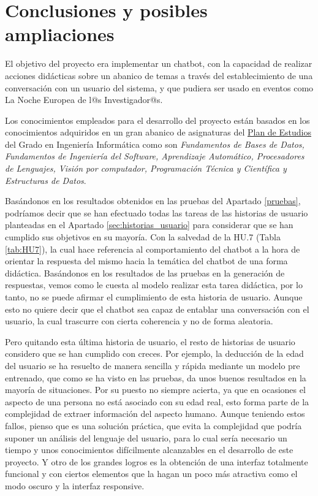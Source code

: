 \chapter{Conclusiones y posibles ampliaciones}

El objetivo del proyecto era implementar un chatbot, con la capacidad de realizar acciones didácticas sobre un abanico de temas a través del establecimiento de una conversación con un usuario del sistema, y que pudiera ser usado en eventos como La Noche Europea de l@s Investigador@s.

Los conocimientos empleados para el desarrollo del proyecto están basados en los conocimientos adquiridos en un gran abanico de asignaturas del \href{https://grados.ugr.es/informatica/pages/infoacademica/estudios}{Plan de Estudios} del Grado en Ingeniería Informática como son \textit{Fundamentos de Bases de Datos, Fundamentos de Ingeniería del Software, Aprendizaje Automático, Procesadores de Lenguajes, Visión por computador, Programación Técnica y Científica y Estructuras de Datos}.

Basándonos en los resultados obtenidos en las pruebas del Apartado \ref{pruebas}, podríamos decir que se han efectuado todas las tareas de las historias de usuario planteadas en el Apartado \ref{sec:historias_usuario} para considerar que se han cumplido sus objetivos en su mayoría. Con la salvedad de la HU.7 (Tabla \ref{tab:HU7}), la cual hace referencia al comportamiento del chatbot a la hora de orientar la respuesta del mismo hacia la temática del chatbot de una forma didáctica. Basándonos en los resultados de las pruebas en la generación de respuestas, vemos como le cuesta al modelo realizar esta tarea didáctica, por lo tanto, no se puede afirmar el cumplimiento de esta historia de usuario. Aunque esto no quiere decir que el chatbot sea capaz de entablar una conversación con el usuario, la cual trascurre con cierta coherencia y no de forma aleatoria.

Pero quitando esta última historia de usuario, el resto de historias de usuario considero que se han cumplido con creces. Por ejemplo, la deducción de la edad del usuario se ha resuelto de manera sencilla y rápida mediante un modelo pre entrenado, que como se ha visto en las pruebas, da unos buenos resultados en la mayoría de situaciones. Por su puesto no siempre acierta, ya que en ocasiones el aspecto de una persona no está asociado con su edad real, esto forma parte de la complejidad de extraer información del aspecto humano. Aunque teniendo estos fallos, pienso que es una solución práctica, que evita la complejidad que podría suponer un análisis del lenguaje del usuario, para lo cual sería necesario un tiempo y unos conocimientos difícilmente alcanzables en el desarrollo de este proyecto. Y otro de los grandes logros es la obtención de una interfaz totalmente funcional y con ciertos elementos que la hagan un poco más atractiva como el modo oscuro y la interfaz responsive.

